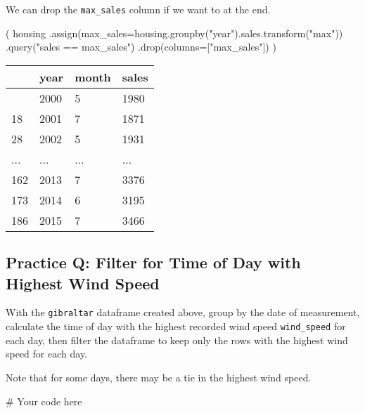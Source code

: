 \documentclass[
  letterpaper,
  DIV=11,
  numbers=noendperiod]{scrreprt}
\newenvironment{Shaded}{\begin{snugshade}}{\end{snugshade}}
\newcommand{\CommentTok}[1]{\textcolor[rgb]{0.37,0.37,0.37}{#1}}
\newcommand{\NormalTok}[1]{\textcolor[rgb]{0.00,0.23,0.31}{#1}}
\newcommand{\OperatorTok}[1]{\textcolor[rgb]{0.37,0.37,0.37}{#1}}
\newcommand{\StringTok}[1]{\textcolor[rgb]{0.13,0.47,0.30}{#1}}
\begin{document}
We can drop the \texttt{max\_sales} column if we want to at the end.

\begin{Shaded}
\begin{Highlighting}[]
\NormalTok{(}
\NormalTok{housing}
\NormalTok{  .assign(max\_sales}\OperatorTok{=}\NormalTok{housing.groupby(}\StringTok{"year"}\NormalTok{).sales.transform(}\StringTok{"max"}\NormalTok{))}
\NormalTok{  .query(}\StringTok{"sales == max\_sales"}\NormalTok{)}
\NormalTok{  .drop(columns}\OperatorTok{=}\NormalTok{[}\StringTok{"max\_sales"}\NormalTok{])}
\NormalTok{)}
\end{Highlighting}
\end{Shaded}

\begin{longtable}[]{@{}llll@{}}
\toprule\noalign{}
& year & month & sales \\
\midrule\noalign{}
\endhead
\bottomrule\noalign{}
\endlastfoot
4 & 2000 & 5 & 1980 \\
18 & 2001 & 7 & 1871 \\
28 & 2002 & 5 & 1931 \\
... & ... & ... & ... \\
162 & 2013 & 7 & 3376 \\
173 & 2014 & 6 & 3195 \\
186 & 2015 & 7 & 3466 \\
\end{longtable}

\begin{tcolorbox}[enhanced jigsaw, colframe=quarto-callout-tip-color-frame, opacityback=0, titlerule=0mm, bottomrule=.15mm, breakable, leftrule=.75mm, colbacktitle=quarto-callout-tip-color!10!white, title=\textcolor{quarto-callout-tip-color}{\faLightbulb}\hspace{0.5em}{Practice}, rightrule=.15mm, coltitle=black, opacitybacktitle=0.6, colback=white, left=2mm, arc=.35mm, toptitle=1mm, bottomtitle=1mm, toprule=.15mm]

\subsection{Practice Q: Filter for Time of Day with Highest Wind
Speed}\label{practice-q-filter-for-time-of-day-with-highest-wind-speed}

With the \texttt{gibraltar} dataframe created above, group by the date
of measurement, calculate the time of day with the highest recorded wind
speed \texttt{wind\_speed} for each day, then filter the dataframe to
keep only the rows with the highest wind speed for each day.

Note that for some days, there may be a tie in the highest wind speed.

\begin{Shaded}
\begin{Highlighting}[]
\CommentTok{\# Your code here}
\end{Highlighting}
\end{Shaded}

\end{tcolorbox}
\end{document}
